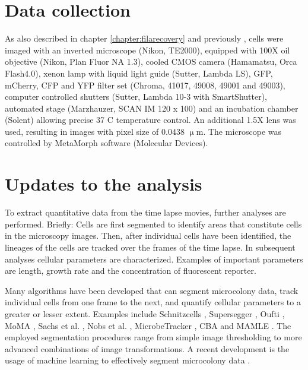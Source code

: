\section{Data collection}
As also described in chapter \ref{chapter:filarecovery} and previously \cite{Boulineau2013, Kiviet2014}, 
cells were imaged with an inverted microscope (Nikon, TE2000), equipped with 100X oil objective (Nikon, Plan Fluor NA 1.3), 
cooled CMOS camera (Hamamatsu, Orca Flash4.0), xenon lamp with liquid light guide (Sutter, Lambda LS), GFP, mCherry, CFP and YFP filter set (Chroma, 41017, 49008, 49001 and 49003), 
computer controlled shutters (Sutter, Lambda 10-3 with SmartShutter), automated stage (Marzhauzer, SCAN IM 120 x 100) and an incubation chamber (Solent) allowing precise 37 C temperature control. 
An additional 1.5X lens was used, resulting in images with pixel size of 0.0438 $\upmu$m. The microscope was controlled by MetaMorph software (Molecular Devices). 

\section{Updates to the analysis}
To extract quantitative data from the time lapse movies, further analyses are performed.
Briefly: Cells are first segmented to identify areas that constitute cells in the microscopy images. Then, after individual cells have been identified, the lineages of the cells are tracked over the frames of the time lapse. In subsequent analyses cellular parameters are characterized. Examples of important parameters are length, growth rate and the concentration of fluorescent reporter.

Many algorithms have been developed that can segment microcolony data, track individual cells from one frame to the next, and quantify cellular parameters to a greater or lesser extent. Examples include Schnitzcells \cite{Young2012, Kiviet2014}, Supersegger \cite{Stylianidou2016}, Oufti \cite{Paintdakhi2016}, MoMA \cite{Kaiser2016}, Sachs et al. \cite{Sachs2016}, Nobs et al. \cite{Nobs2014}, MicrobeTracker \cite{Sliusarenko2011, Ullman2013}, CBA \cite{Sadanandan2016} and MAMLE \cite{Chowdhury2013}. 
The employed segmentation procedures range from simple image thresholding to more advanced combinations of image transformations. 
A recent development is the usage of machine learning to effectively segment microcolony data \cite{VanValen2016}.

